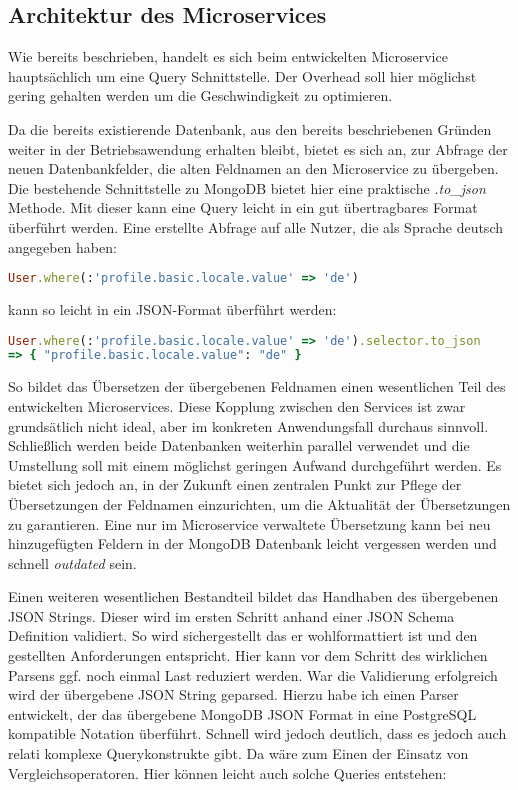 
\subsection{Architektur des Microservices}
Wie bereits beschrieben, handelt es sich beim entwickelten Microservice hauptsächlich um eine Query Schnittstelle. Der Overhead soll hier möglichst gering gehalten werden um die Geschwindigkeit zu optimieren.

Da die bereits existierende Datenbank, aus den bereits beschriebenen Gründen weiter in der Betriebsawendung erhalten bleibt, bietet es sich an, zur Abfrage der neuen Datenbankfelder, die alten Feldnamen an den Microservice zu übergeben.
Die bestehende Schnittstelle zu MongoDB bietet hier eine praktische \textit{.to\_json} Methode. Mit dieser kann eine Query leicht in ein gut übertragbares Format überführt werden. Eine erstellte Abfrage auf alle Nutzer, die als Sprache deutsch angegeben haben:

\begin{lstlisting}[language=Ruby]
User.where(:'profile.basic.locale.value' => 'de')
\end{lstlisting}

\noindent kann so leicht in ein JSON-Format überführt werden:

\begin{lstlisting}[language=Ruby]
User.where(:'profile.basic.locale.value' => 'de').selector.to_json
=> { "profile.basic.locale.value": "de" }
\end{lstlisting}

\noindent So bildet das Übersetzen der übergebenen Feldnamen einen wesentlichen Teil des entwickelten Microservices.
Diese Kopplung zwischen den Services ist zwar grundsätlich nicht ideal, aber im konkreten Anwendungsfall durchaus sinnvoll. Schließlich werden beide Datenbanken weiterhin parallel verwendet und die Umstellung soll mit einem möglichst geringen Aufwand durchgeführt werden.
Es bietet sich jedoch an, in der Zukunft einen zentralen Punkt zur Pflege der Übersetzungen der Feldnamen einzurichten, um die Aktualität der Übersetzungen zu garantieren. Eine nur im Microservice verwaltete Übersetzung kann bei neu hinzugefügten Feldern in der MongoDB Datenbank leicht vergessen werden und schnell \textit{outdated} sein.

Einen weiteren wesentlichen Bestandteil bildet das Handhaben des übergebenen JSON Strings. Dieser wird im ersten Schritt anhand einer JSON Schema\cite{jsonschema} Definition validiert. So wird sichergestellt das er wohlformattiert ist und den gestellten Anforderungen entspricht. Hier kann vor dem Schritt des wirklichen Parsens ggf. noch einmal Last reduziert werden. War die Validierung erfolgreich wird der übergebene JSON String geparsed. Hierzu habe ich einen Parser entwickelt, der das übergebene MongoDB JSON Format in eine PostgreSQL kompatible Notation überführt. Schnell wird jedoch deutlich, dass es jedoch auch relati komplexe Querykonstrukte gibt. Da wäre zum Einen der Einsatz von Vergleichsoperatoren. Hier können leicht auch solche Queries entstehen:

